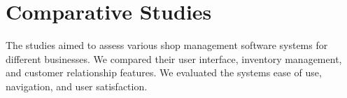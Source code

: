 \section{Comparative Studies}
The studies aimed to assess various shop management software systems for different businesses. We compared their user interface, inventory management, and customer relationship features. We evaluated the systems ease of use, navigation, and user satisfaction.